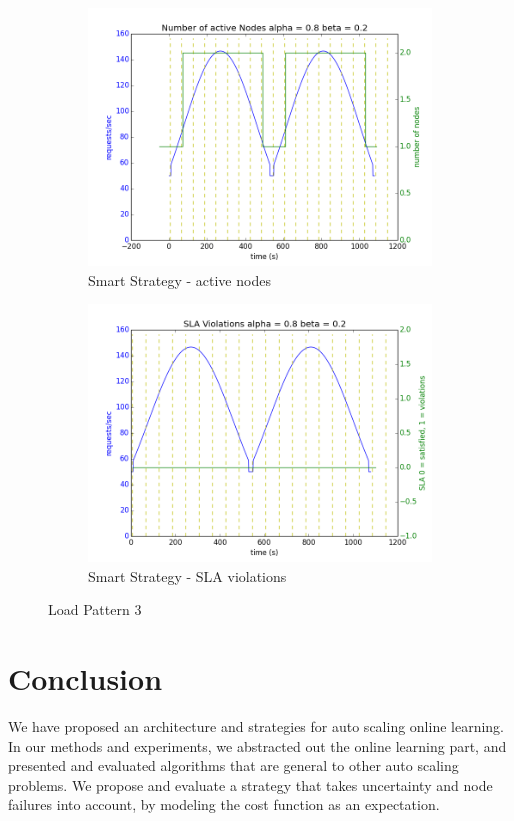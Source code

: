\documentclass[12pt]{article}
\begin{document}
\begin{figure}[h!]
\begin{subfigure}{.5\textwidth}
\includegraphics[width=\textwidth]{Smart382nodes.png}
\caption{Smart Strategy - active nodes}
\end{subfigure}
\begin{subfigure}{.5\textwidth}
\includegraphics[width=\textwidth]{Smart382SLA.png}
\caption{Smart Strategy - SLA violations}
\end{subfigure}

\label{load3}
\caption{Load Pattern 3}
\end{figure}

\section{Conclusion}
We have proposed an architecture and strategies for auto scaling online
learning. In our methods and experiments, we abstracted out the online learning
part, and presented and evaluated algorithms that are general to other auto
scaling problems. We propose and evaluate a strategy that takes uncertainty and
node failures into account, by modeling the cost function as an expectation.
\end{document}
